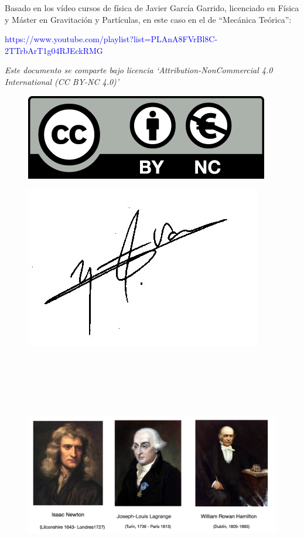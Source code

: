 \justify


Basado en los vídeo cursos de física de Javier García Garrido, licenciado en Física y Máster en Gravitación y Partículas, en este caso en el de ``Mecánica Teórica'':

\begin{center} \textcolor{blue}{https://www.youtube.com/playlist?list=PLAnA8FVrBl8C-2TTrbArT1g04RJEckRMG} \end{center}




\emph{\normalsize{Este} documento se comparte bajo licencia `Attribution-NonCommercial 4.0 International (CC BY-NC 4.0)'}


\begin{multicols}{2}
\begin{figure}[H]
	\centering
	\includegraphics[width=.4
	\textwidth]{imagenes/licencia.png}
	
\end{figure}
\begin{figure}[H]
	\centering
	\includegraphics[width=.3
	\textwidth]{imagenes/firma.png}
\end{figure}
\end{multicols}

\newpage




\newpage

$\,$

\newpage

$\,$

\vspace{1cm} 

$\,$

\begin{figure}[H]
	\centering
	\includegraphics[width=.75\textwidth]{imagenes/portada.png}
\end{figure}


